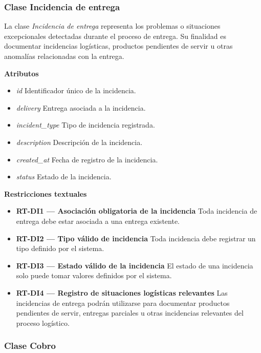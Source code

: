 \subsubsection{Clase Incidencia de entrega}

La clase \textit{Incidencia de entrega} representa los problemas o situaciones excepcionales detectadas durante el proceso de entrega. Su finalidad es documentar incidencias logísticas, productos pendientes de servir u otras anomalías relacionadas con la entrega.

\textbf{Atributos}

\begin{itemize}
      \item \textit{id}
            Identificador único de la incidencia.
      \item \textit{delivery}
            Entrega asociada a la incidencia.
      \item \textit{incident\_type}
            Tipo de incidencia registrada.
      \item \textit{description}
            Descripción de la incidencia.
      \item \textit{created\_at}
            Fecha de registro de la incidencia.
      \item \textit{status}
            Estado de la incidencia.
\end{itemize}

\textbf{Restricciones textuales}

\begin{itemize}
      \item \textbf{RT-DI1 — Asociación obligatoria de la incidencia}
            Toda incidencia de entrega debe estar asociada a una entrega existente.
      \item \textbf{RT-DI2 — Tipo válido de incidencia}
            Toda incidencia debe registrar un tipo definido por el sistema.
      \item \textbf{RT-DI3 — Estado válido de la incidencia}
            El estado de una incidencia solo puede tomar valores definidos por el sistema.
      \item \textbf{RT-DI4 — Registro de situaciones logísticas relevantes}
            Las incidencias de entrega podrán utilizarse para documentar productos pendientes de servir, entregas parciales u otras incidencias relevantes del proceso logístico.
\end{itemize}

\subsubsection{Clase Cobro}

